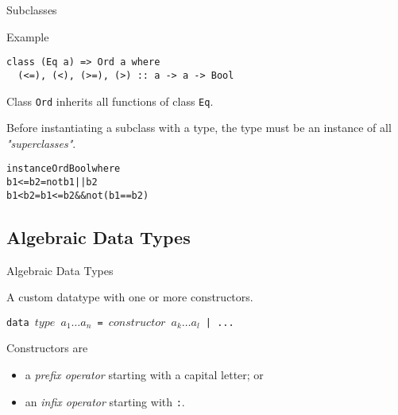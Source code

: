 \documentclass{beamer}
\def\code#1{\texttt{\frenchspacing#1}}
\begin{document}
\begin{frame}[fragile]{Subclasses}

\begin{exampleblock}{Example}
\begin{verbatim}
class (Eq a) => Ord a where
  (<=), (<), (>=), (>) :: a -> a -> Bool
\end{verbatim}

Class \code{Ord} inherits all functions of class \code{Eq}.
\end{exampleblock}

\pause

\vspace{1cm}
Before instantiating a subclass with a type, the type must be an instance of all \textit{"superclasses"}.

\pause

\begin{alltt}
instance Ord Bool where
  b1 <= b2 = not b1 || b2
  b1 < b2 = b1 <= b2 && not(b1 == b2)
\end{alltt}

\end{frame}

\subsection{Algebraic Data Types}

\begin{frame}{Algebraic Data Types}

A custom datatype with one or more constructors.

\pause

\begin{block}{\centering \code{data $type$ $a_1 \dots a_n$ = $constructor$ $a_k \dots a_l$ | ...}}
\end{block}

\pause

\vspace{1cm}
Constructors are
\begin{itemize}
    \item a \textit{prefix operator} starting with a capital letter; or
    \item an \textit{infix operator} starting with \code{:}.
\end{itemize}

\end{frame}
\end{document}
